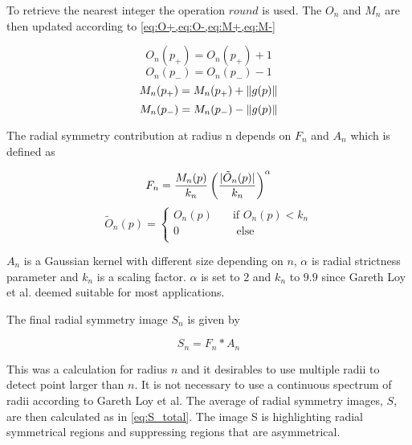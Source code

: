 To retrieve the nearest integer the operation $round$ is used. The $O_n$ and $M_n$ are then updated according to \cref{eq:O+,eq:O-,eq:M+,eq:M-}

\begin{equation} \label{eq:O+}
O_{n}(p_{+}) = O_{n}(p_{+}) + 1
\end{equation}
\begin{equation} \label{eq:O-}
O_{n}(p_{-}) = O_{n}(p_{-}) - 1
\end{equation}
\begin{equation} \label{eq:M+}
M_{n}(p_{+}) = M_{n}(p_{+}) + \lVert g(p)\rVert
\end{equation}
\begin{equation} \label{eq:M-}
M_{n}(p_{-}) = M_{n}(p_{-}) - \lVert g(p)\rVert
\end{equation}

The radial symmetry contribution at radius n depends on $F_n$ and $A_n$ which is defined as 

\begin{equation} \label{eq:F}
F_n = \frac{M_{n}(p)}{k_n} \left(\frac{\lvert\tilde{O}_n(p)\rvert}{k_n}\right)^{\alpha}
\end{equation}
\begin{equation} \label{eq:A}
\tilde{O}_n(p) =   
\begin{cases}
O_n(p)    & \quad \text{if } O_n(p) < k_n\\
0		& \quad  \text{ else}\\
\end{cases}
\end{equation}

$A_n$ is a Gaussian kernel with different size depending on $n$, $\alpha$ is radial strictness parameter and $k_n$ is a scaling factor. $\alpha$ is set to $2$ and $k_n$ to $9.9$ since Gareth Loy et al. deemed suitable for most applications.

The final radial symmetry image $S_n$ is given by 

\begin{equation} \label{eq:S_for_n}
S_{n} = F_n * A_n
\end{equation}

This was a calculation for radius $n$ and it desirables to use multiple radii to detect point larger than $n$. It is not necessary to use a continuous spectrum of radii according to Gareth Loy et al. The average of radial symmetry images, $S$, are then calculated as in \cref{eq:S_total}. The image S is highlighting radial symmetrical regions and suppressing regions that are asymmetrical.  

